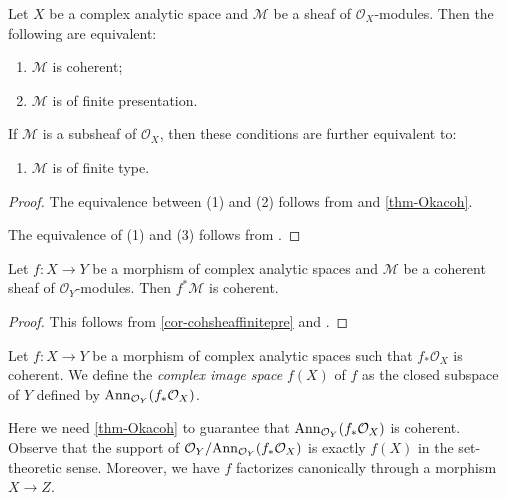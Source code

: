 \begin{corollary}\label{cor-cohsheaffinitepre}
    Let $X$ be a complex analytic space and $\mathcal{M}$ be a sheaf of $\mathcal{O}_X$-modules. Then the following are equivalent:
    \begin{enumerate}
        \item $\mathcal{M}$ is coherent;
        \item $\mathcal{M}$ is of finite presentation.
    \end{enumerate}
    If $\mathcal{M}$ is a subsheaf of $\mathcal{O}_X$, then these conditions are further equivalent to:
    \begin{enumerate}[resume]
        \item $\mathcal{M}$ is of finite type.
    \end{enumerate}
\end{corollary}
\begin{proof}
    The equivalence between (1) and (2) follows from \cite[\href{https://stacks.math.columbia.edu/tag/01BZ}{Tag 01BZ}]{stacks-project} and \cref{thm-Okacoh}.

    The equivalence of (1) and (3) follows from \cite[\href{https://stacks.math.columbia.edu/tag/01BY}{Tag 01BY}]{stacks-project}.
\end{proof}

\begin{corollary}\label{cor-pullbackcoh}
    Let $f:X\rightarrow Y$ be a morphism of complex analytic spaces and $\mathcal{M}$ be a coherent sheaf of $\mathcal{O}_Y$-modules. Then $f^*\mathcal{M}$ is coherent.
\end{corollary}
\begin{proof}
    This follows from \cref{cor-cohsheaffinitepre} and \cite[\href{https://stacks.math.columbia.edu/tag/01BQ}{Tag 01BQ}]{stacks-project}.
\end{proof}

\begin{definition}
    Let $f:X\rightarrow Y$ be a morphism of complex analytic spaces such that $f_*\mathcal{O}_X$ is coherent. We define the \emph{complex image space} $f(X)$ of $f$ as the closed subspace of $Y$ defined by $\mathrm{Ann}_{\mathcal{O}_Y}(f_*\mathcal{O}_X)$.
\end{definition}
Here we need \cref{thm-Okacoh} to guarantee that $\mathrm{Ann}_{\mathcal{O}_Y}(f_*\mathcal{O}_X)$ is coherent. Observe that the support of $\mathcal{O}_Y/\mathrm{Ann}_{\mathcal{O}_Y}(f_*\mathcal{O}_X)$ is exactly $f(X)$ in the set-theoretic sense. Moreover, we have $f$ factorizes canonically through a morphism $X\rightarrow Z$.


